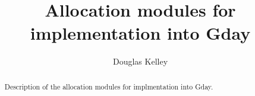 \documentclass[]{report}
\title{Allocation modules for implementation into Gday}
\author{Douglas Kelley}
\begin{document}
\maketitle
\begin{abstract}
Description of the allocation modules for implmentation into Gday.
\end{abstract}


\tableofcontents


\end{document}

